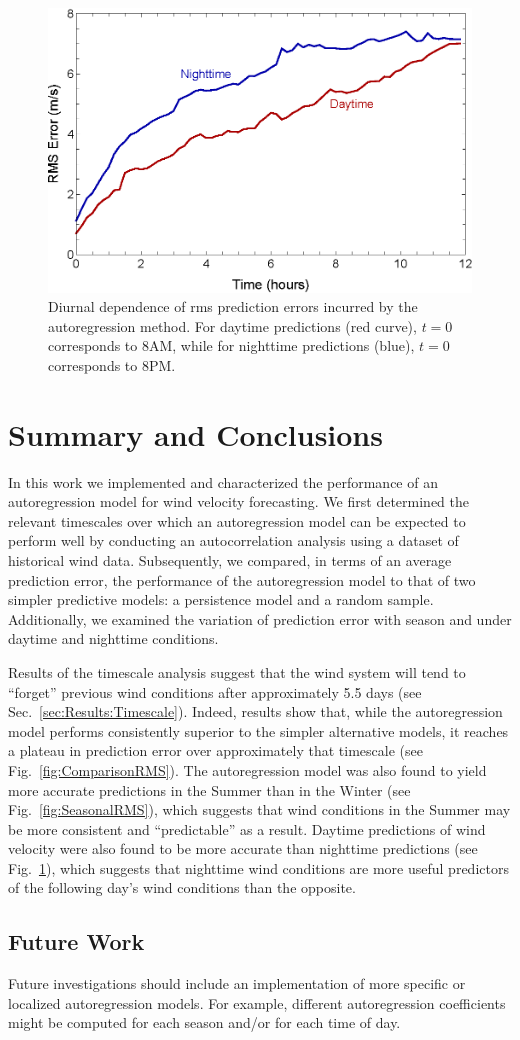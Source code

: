 \documentclass[11pt, oneside]{article}
\newcommand{\figref}[1]{Fig.~\ref{#1}}
\newcommand{\secref}[1]{Sec.~\ref{#1}}
\begin{document}
\begin{figure}[htb]
\centering
\includegraphics[width=0.7\columnwidth]{figures/DiurnalRMSPredictionError}
\caption{Diurnal dependence of rms prediction errors incurred by the autoregression method.
For daytime predictions (red curve), $t = 0$ corresponds to 8AM, while for nighttime predictions (blue), $t = 0$ corresponds to 8PM.}
\label{fig:DiurnalRMS}
\end{figure}

\section{Summary and Conclusions}\label{sec:Conclusions}
In this work we implemented and characterized the performance of an autoregression model for wind velocity forecasting.
We first determined the relevant timescales over which an autoregression model can be expected to perform well by conducting an autocorrelation analysis using a dataset of historical wind data.
Subsequently, we compared, in terms of an average prediction error, the performance of the autoregression model to that of two simpler predictive models: a persistence model and a random sample.
Additionally, we examined the variation of prediction error with season and under daytime and nighttime conditions.

Results of the timescale analysis suggest that the wind system will tend to ``forget'' previous wind conditions after approximately 5.5 days (see \secref{sec:Results:Timescale}).
Indeed, results show that, while the autoregression model performs consistently superior to the simpler alternative models, it reaches a plateau in prediction error over approximately that timescale (see \figref{fig:ComparisonRMS}).
The autoregression model was also found to yield more accurate predictions in the Summer than in the Winter (see \figref{fig:SeasonalRMS}), which suggests that wind conditions in the Summer may be more consistent and ``predictable'' as a result.
Daytime predictions of wind velocity were also found to be more accurate than nighttime predictions (see \figref{fig:DiurnalRMS}), which suggests that nighttime wind conditions are more useful predictors of the following day's wind conditions than the opposite.

\subsection{Future Work}
Future investigations should include an implementation of more specific or localized autoregression models.
For example, different autoregression coefficients might be computed for each season and/or for each time of day.



\end{document}
